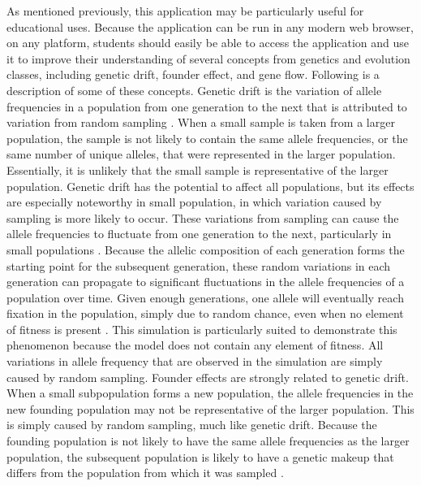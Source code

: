 \documentclass[12pt]{article}
\begin{document}
\begin{spacing}{1.6}
As mentioned previously, this application may be particularly useful for educational uses. Because the application can be run in any modern web browser, on any platform, students should easily be able to access the application and use it to improve their understanding of several concepts from genetics and evolution classes, including genetic drift, founder effect, and gene flow. Following is a description of some of these concepts.\newline
\newline
Genetic drift is the variation of allele frequencies in a population from one generation to the next that is attributed to variation from random sampling \cite{evolution}. When a small sample is taken from a larger population, the sample is not likely to contain the same allele frequencies, or the same number of unique alleles, that were represented in the larger population. Essentially, it is unlikely that the small sample is representative of the larger population. Genetic drift has the potential to affect all populations, but its effects are especially noteworthy in small population, in which variation caused by sampling is more likely to occur. These variations from sampling can cause the allele frequencies to fluctuate from one generation to the next, particularly in small populations \cite{evolution}. Because the allelic composition of each generation forms the starting point for the subsequent generation, these random variations in each generation can propagate to significant fluctuations in the allele frequencies of a population over time. Given enough generations, one allele will eventually reach fixation in the population, simply due to random chance, even when no element of fitness is present \cite{evolution}. This simulation is particularly suited to demonstrate this phenomenon because the model does not contain any element of fitness. All variations in allele frequency that are observed in the simulation are simply caused by random sampling.\newline
\newline
Founder effects are strongly related to genetic drift. When a small subpopulation forms a new population, the allele frequencies in the new founding population may not be representative of the larger population. This is simply caused by random sampling, much like genetic drift. Because the founding population is not likely to have the same allele frequencies as the larger population, the subsequent population is likely to have a genetic makeup that differs from the population from which it was sampled \cite{genAnalysis}.\newline

\end{spacing}
\end{document}
